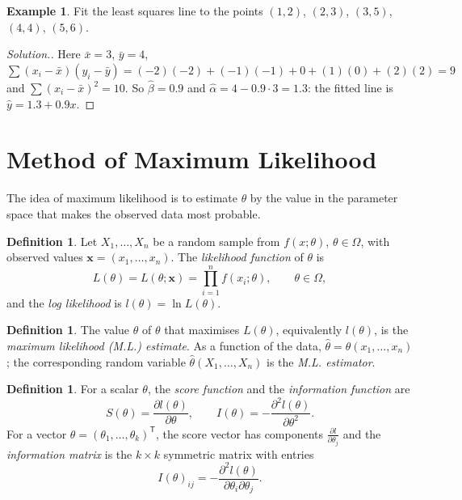 \documentclass[12pt,a4paper]{report}
\theoremstyle{definition}
\newtheorem{definition}[thm]{Definition}
\newtheorem{example}[thm]{Example}
\theoremstyle{plain}
\newenvironment{solution}
  {\renewcommand{\qedsymbol}{}\begin{proof}[\textit{Solution}.]}
  {\end{proof}}
\begin{document}
\begin{example}
\label{ex:lsenumeric}
Fit the least squares line to the points $(1,2)$, $(2,3)$, $(3,5)$, $(4,4)$,
$(5,6)$.
\end{example}

\begin{solution}
Here $\bar x = 3$, $\bar y = 4$, $\sum(x_i - \bar x)(y_i - \bar y) = (-2)(-2) +
(-1)(-1) + 0 + (1)(0) + (2)(2) = 9$ and $\sum(x_i - \bar x)^2 = 10$. So
$\hat\beta = 0.9$ and $\hat\alpha = 4 - 0.9\cdot 3 = 1.3$: the fitted line is
$\hat y = 1.3 + 0.9x$.
\end{solution}

\section{Method of Maximum Likelihood}

The idea of maximum likelihood is to estimate $\theta$ by the value in the
parameter space that makes the observed data most probable.

\begin{definition}
\label{def:likelihood}
Let $X_1, \dots , X_n$ be a random sample from $f(x;\theta)$, $\theta \in \Omega$,
with observed values $\mathbf x = (x_1, \dots, x_n)$. The \emph{likelihood
function} of $\theta$ is
\[L(\theta) = L(\theta;\mathbf x) = \prod^n_{i = 1}f(x_i;\theta) ,\qquad \theta
\in \Omega ,\]
and the \emph{log likelihood} is $l(\theta) = \ln L(\theta)$.
\end{definition}

\begin{definition}
\label{def:mle}
The value $\hat\theta$ of $\theta$ that maximises $L(\theta)$, equivalently
$l(\theta)$, is the \emph{maximum likelihood (M.L.) estimate}. As a function of the
data, $\hat{\theta} = \hat{\theta}(x_1, \dots , x_n)$; the corresponding random
variable $\hat{\theta}(X_1, \dots, X_n)$ is the \emph{M.L. estimator}.
\end{definition}

\begin{definition}
\label{def:score}
For a scalar $\theta$, the \emph{score function} and the \emph{information
function} are
\[S(\theta) = \frac{\partial l(\theta)}{\partial \theta} ,\qquad I(\theta) =
-\frac{\partial^2 l(\theta)}{\partial \theta^2} .\]
For a vector $\theta = (\theta_1, \dots , \theta_k)^{\mathsf T}$, the score
vector has components $\frac{\partial l}{\partial \theta_j}$ and the
\emph{information matrix} is the $k\times k$ symmetric matrix with entries
\[I(\theta)_{ij} = -\frac{\partial^2 l(\theta)}{\partial \theta_i\partial
\theta_j} .\]
\end{definition}
\end{document}
